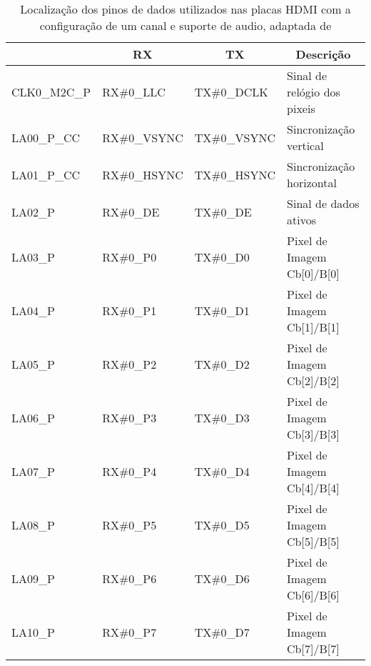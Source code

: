 \begin{longtable}[]
	{@{}llll@{}}
	\caption[Localização dos pinos de dados utilizados nas placas HDMI com a configuração de um canal e suporte de audio]{Localização dos pinos de dados utilizados nas placas HDMI com a configuração de um canal e suporte de audio, adaptada de \cite{R014}}
	\label{table:HDMI1canal+audioDETAIL}
	\hline
	\centering
		\multicolumn{1}{c}{\textbf{PORTA}} & \multicolumn{1}{c}{\textbf{RX}} & \multicolumn{1}{c}{\textbf{TX}} & \multicolumn{1}{c}{\textbf{Descrição}} \\ \hline \endhead		
		CLK0\_M2C\_P & RX\#0\_LLC                         & TX\#0\_DCLK                          & Sinal de relógio dos pixeis          \\ 
		LA00\_P\_CC  & RX\#0\_VSYNC                       & TX\#0\_VSYNC                         & Sincronização vertical               \\ 
		LA01\_P\_CC  & RX\#0\_HSYNC                       & TX\#0\_HSYNC                         & Sincronização horizontal             \\ 
		LA02\_P      & RX\#0\_DE                          & TX\#0\_DE                            & Sinal de dados ativos                \\ 
		LA03\_P      & RX\#0\_P0                          & TX\#0\_D0                            & Pixel de Imagem Cb{[}0{]}/B{[}0{]}   \\ 
		LA04\_P      & RX\#0\_P1                          & TX\#0\_D1                            & Pixel de Imagem Cb{[}1{]}/B{[}1{]}   \\ 
		LA05\_P      & RX\#0\_P2                          & TX\#0\_D2                            & Pixel de Imagem Cb{[}2{]}/B{[}2{]}   \\ 
		LA06\_P      & RX\#0\_P3                          & TX\#0\_D3                            & Pixel de Imagem Cb{[}3{]}/B{[}3{]}   \\ 
		LA07\_P      & RX\#0\_P4                          & TX\#0\_D4                            & Pixel de Imagem Cb{[}4{]}/B{[}4{]}   \\ 
		LA08\_P      & RX\#0\_P5                          & TX\#0\_D5                            & Pixel de Imagem Cb{[}5{]}/B{[}5{]}   \\ 
		LA09\_P      & RX\#0\_P6                          & TX\#0\_D6                            & Pixel de Imagem Cb{[}6{]}/B{[}6{]}   \\ 
		LA10\_P      & RX\#0\_P7                          & TX\#0\_D7                            & Pixel de Imagem Cb{[}7{]}/B{[}7{]}   \\ 

\end{longtable}
